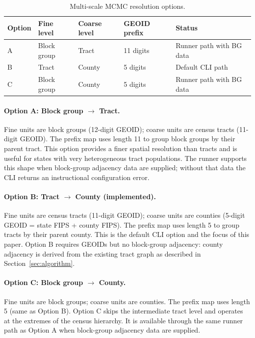 \begin{table}[h]
\centering
\caption{Multi-scale MCMC resolution options.}
\label{tab:resolution-options}
\begin{tabular}{lllll}
\toprule
Option & Fine level & Coarse level & GEOID prefix & Status \\
\midrule
A & Block group & Tract  & 11 digits & Runner path with BG data \\
B & Tract       & County & 5 digits  & Default CLI path \\
C & Block group & County & 5 digits & Runner path with BG data \\
\bottomrule
\end{tabular}
\end{table}

\paragraph{Option A: Block group $\to$ Tract.}
Fine units are block groups (12-digit GEOID); coarse units are census tracts
(11-digit GEOID).
The prefix map uses length 11 to group block groups by their parent tract.
This option provides a finer spatial resolution than tracts and is useful for
states with very heterogeneous tract populations.
The runner supports this shape when block-group adjacency data are supplied;
without that data the CLI returns an instructional configuration error.

\paragraph{Option B: Tract $\to$ County (implemented).}
Fine units are census tracts (11-digit GEOID); coarse units are counties
(5-digit GEOID = state FIPS + county FIPS).
The prefix map uses length 5 to group tracts by their parent county.
This is the default CLI option and the focus of this paper.
Option B requires GEOIDs but no block-group adjacency: county adjacency is
derived from the existing tract graph as described in Section~\ref{sec:algorithm}.

\paragraph{Option C: Block group $\to$ County.}
Fine units are block groups; coarse units are counties.
The prefix map uses length 5 (same as Option B).
Option C skips the intermediate tract level and operates at the extremes of
the census hierarchy.
It is available through the same runner path as Option A when block-group
adjacency data are supplied.

